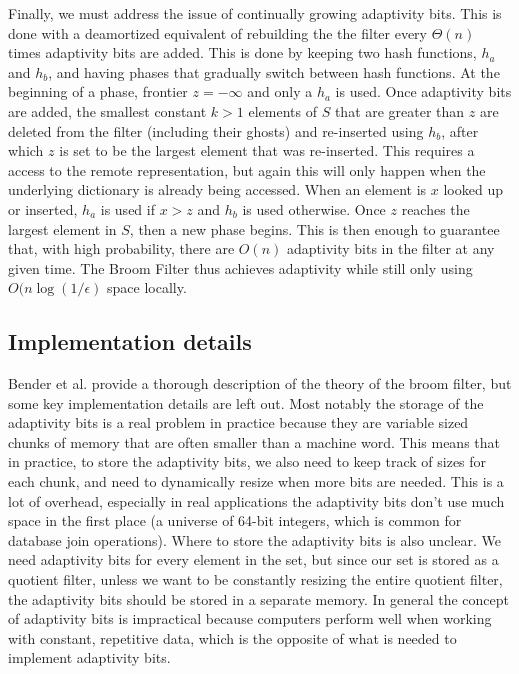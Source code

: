 \documentclass[../paper.tex]{subfiles}
\begin{document}
     Finally, we must address the issue of continually growing adaptivity bits.
     This is done with a deamortized equivalent of rebuilding the the filter
     every $\Theta (n)$ times adaptivity bits are added.  This is done by
     keeping two hash functions, $h_a$ and $h_b$, and having phases that
     gradually switch between hash functions.  At the beginning of a phase,
     frontier $z = -\infty$ and only a $h_a$ is used.  Once adaptivity bits are
     added, the smallest constant $k > 1$ elements of $S$ that are greater than
     $z$ are deleted from the filter (including their ghosts) and re-inserted
     using $h_b$, after which $z$ is set to be the largest element that was
     re-inserted.  This requires a access to the remote representation, but
     again this will only happen when the underlying dictionary is already
     being accessed.  When an element is $x$ looked up or inserted, $h_a$ is
     used if $x > z$ and $h_b$ is used otherwise.  Once $z$ reaches the largest
     element in $S$, then a new phase begins.  This is then enough to guarantee
     that, with high probability, there are $O(n)$ adaptivity bits in the
     filter at any given time.  The Broom Filter thus achieves adaptivity while
     still only using $O(n \log (1/\epsilon)$ space locally.  


\subsection{Implementation details}

Bender et al. \cite{broom-filter} provide a thorough description of the theory of
the broom filter, but some key implementation details are left out.
Most notably the storage of the adaptivity bits is a real problem
in practice because they are variable sized chunks of memory that
are often smaller than a machine word. This means that in practice,
to store the adaptivity bits, we also need to keep track of sizes
for each chunk, and need to dynamically resize when more bits are needed.
This is a lot of overhead, especially in real applications the adaptivity
bits don't use much space in the first place (a universe of 64-bit integers,
which is common for database join operations). Where to store the adaptivity
bits is also unclear. We need adaptivity bits for every element in
the set, but since our set is stored as a quotient filter, unless
we want to be constantly resizing the entire quotient filter, the
adaptivity bits should be stored in a separate memory. In general
the concept of adaptivity bits is impractical because computers perform
well when working with constant, repetitive data, which is the opposite
of what is needed to implement adaptivity bits.
\end{document}
